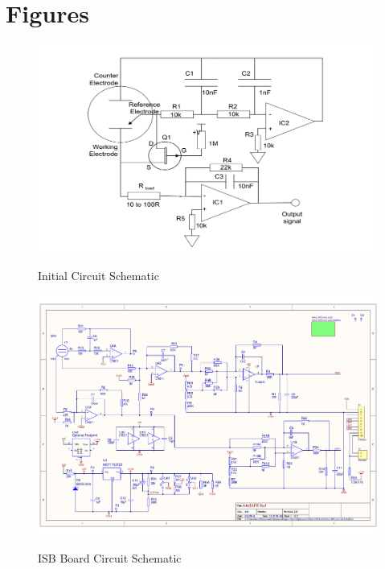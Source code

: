 \chapter{Figures}
\label{sec:Appendix}

\begin{figure}
	\begin{center}
		\includegraphics[width=1\textwidth]{Pics/8}
		\caption{Initial Circuit Schematic}
		\label{fig:A.1}
		\vspace{1.2cm}
		\includegraphics[page=1,width=1\textwidth]{Pics/5.pdf}
		\label{fig:A.2}
		\caption{ISB Board Circuit Schematic}
	\end{center}
\end{figure}



	
	


